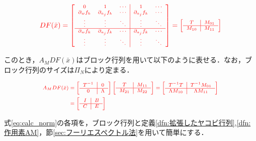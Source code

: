 \documentclass[11pt,a4paper,titlepage]{jsreport}
\theoremstyle{definition}
\providecommand{\DIFdel}[1]{{\protect\color{red} \scriptsize #1}} %
\begin{document}
\begin{displaymath}
  \DIFdel{DF(\bar{x}) = \left[
    \begin{array}{ccc|ccc}
      0 & 1 & \cdots  & 1 & \cdots \\
      \partial_w f_{k} &  \partial_{a_j}f_k & \cdots & \partial_{a_j}f_k & \cdots \\
      \vdots & \vdots & \ddots & \vdots  & \ddots\\ \hline
      \partial_w f_k & \partial_{a_j}f_k & \cdots & \partial_{a_j}f_k & \cdots \\
      \vdots & \vdots & \ddots & \vdots & \ddots
    \end{array}
  \right]
  = \left[ \begin{array}{c|c}
    T & M_{01} \\ \hline
    M_{10} & M_{11}
\end{array} \right]
}\end{displaymath}%

\DIFdel{このとき，$A_M DF(\bar{x})$はブロック行列を用いて以下のように表せる．なお，ブロック行列のサイズは$\Pi_N$により定まる．
}%

\begin{displaymath}
  \DIFdel{\begin{split}
    A_M DF(\bar{x}) &= \left[ \begin{array}{c|c}
      T^{-1} & 0 \\ \hline
      0 & \Lambda
    \end{array}\right]
    \left[ \begin{array}{c|c}
      T & M_{11} \\ \hline
      M_{21} & M_{22}
    \end{array} \right]
    = \left[ \begin{array}{c|c}
      T^{-1} T & T^{-1}M_{01} \\ \hline
      \Lambda M_{10} & \Lambda M_{11}
    \end{array} \right] \\
    &= \left[ \begin{array}{c|c}
      I & B \\ \hline
      C & E
    \end{array} \right]
  \end{split}
}\end{displaymath}%

\DIFdel{式\eqref{eq:calc_norm}の各項を，ブロック行列と定義\ref{dfn:拡張したヤコビ行列},\ref{dfn:作用素AM}，節\ref{sec:フーリエスペクトル法}を用いて簡単にする．
}%
\end{document}
